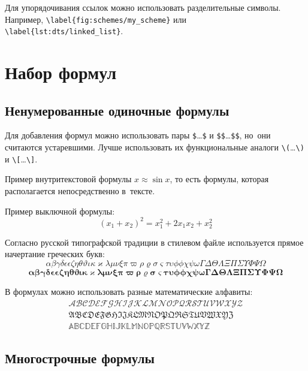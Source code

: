 Для упорядочивания ссылок можно использовать разделительные символы.
Например, \verb+\label{fig:schemes/my_scheme}+ 
или \\ \verb+\label{lst:dts/linked_list}+.




\section{Набор формул}\label{sec:ch1/sec5}

\subsection{Ненумерованные одиночные формулы}\label{subsec:ch1/sec5/sub1}

Для добавления формул можно использовать пары \verb+$+\dots\verb+$+ 
и \verb+$$+\dots\verb+$$+, но~они считаются устаревшими.
Лучше использовать их функциональные аналоги \verb+\(+\dots\verb+\)+ 
и \verb+\[+\dots\verb+\]+.

Пример внутритекстовой формулы \(x \approx \sin x\), то есть формулы,
которая располагается непосредственно в~тексте.

Пример выключной формулы:
\[
    (x_1+x_2)^2 = x_1^2 + 2 x_1 x_2 + x_2^2
\]

Согласно русской типографской традиции в стилевом файле используется
прямое начертание греческих букв:
\[
    \alpha\beta\gamma\delta\epsilon\epsilon\zeta\eta\theta%
    \vartheta\iota\kappa\varkappa\lambda\mu\nu\xi\pi\varpi\rho\varrho%
    \sigma\varsigma\tau\upsilon\phi\phi\chi\psi\omega\Gamma\Delta%
    \Theta\Lambda\Xi\Pi\Sigma\Upsilon\Phi\Psi\Omega
\]
\[
    \boldsymbol{\alpha\beta\gamma\delta\epsilon\epsilon\zeta\eta%
        \theta\vartheta\iota\kappa\varkappa\lambda\mu\nu\xi\pi\varpi\rho%
        \varrho\sigma\varsigma\tau\upsilon\phi\phi\chi\psi\omega\Gamma%
        \Delta\Theta\Lambda\Xi\Pi\Sigma\Upsilon\Phi\Psi\Omega}
\]

В формулах можно использовать разные математические алфавиты:
\begin{align*}
    \mathcal{ABCDEFGHIJKLMNOPQRSTUVWXYZ} \\
    \mathfrak{ABCDEFGHIJKLMNOPQRSTUVWXYZ} \\
    \mathbb{ABCDEFGHIJKLMNOPQRSTUVWXYZ}
\end{align*}



\subsection{Многострочные формулы}\label{sub:ch1/sec5/sub2}

